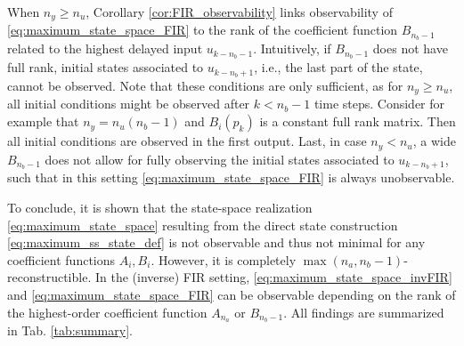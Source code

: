 When $n_y \geq n_u$, Corollary \ref{cor:FIR_observability} links observability of \eqref{eq:maximum_state_space_FIR} to the rank of the coefficient function $B_{n_b-1}$ related to the highest delayed input $u_{k-n_b-1}$. Intuitively, if $B_{n_b-1}$ does not have full rank, initial states associated to $u_{k-n_b+1}$, i.e., the last part of the state, cannot be observed. Note that these conditions are only sufficient, as for $n_y \geq n_u$, all initial conditions might be observed after $k< n_b-1$ time steps. Consider for example that $n_y = n_u (n_b-1)$ and $B_i(p_k)$ is a constant full rank matrix. Then all initial conditions are observed in the first output. Last, in case $n_y < n_u$, a wide $B_{n_b-1}$ does not allow for fully observing the initial states associated to $u_{k-n_b+1}$, such that in this setting \eqref{eq:maximum_state_space_FIR} is always unobservable.

To conclude, it is shown that the state-space realization \eqref{eq:maximum_state_space} resulting from the direct state construction \eqref{eq:maximum_ss_state_def} is not observable and thus not minimal for any coefficient functions $A_i,B_i$. However, it is completely $\max(n_a,n_b-1)$-reconstructible. In the (inverse) FIR setting, \eqref{eq:maximum_state_space_invFIR} and \eqref{eq:maximum_state_space_FIR} can be observable depending on the rank of the highest-order coefficient function $A_{n_a}$ or $B_{n_b-1}$. All findings are summarized in Tab. \ref{tab:summary}.

